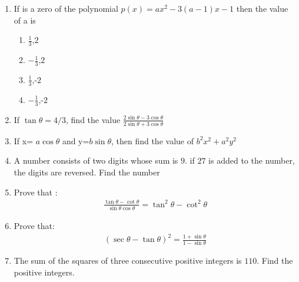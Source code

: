 \begin{enumerate}
\item If is a zero of the polynomial $p(x)=ax^2-3(a-1)x-1$  then the value of a is 
\begin{enumerate}
\item $\frac{1}{3}$,$2$
\item $-\frac{1}{3}$,$2$
\item $\frac{1}{3}$,-$2$
\item $-\frac{1}{3}$,-$2$
\end{enumerate}



\item If  $\tan \theta = 4/3$, find the value 
$\frac{2\sin \theta -3\cos \theta}{2\sin\theta+3\cos\theta}$

\item If x=  $a\cos\theta$ and y=$b\sin\theta$, then find the value of   $b^2x^2+a^2y^2$

\item A number consists of two digits whose sum is $9$. if $27$ is added to the number, the digits are reversed. Find the number
\item Prove that :
\begin{align}
\frac{\tan\theta-\cot\theta}{\sin\theta\cos\theta}=\tan^2\theta-\cot^2\theta 
\end{align}
\item Prove that:
\begin{align}
(\sec\theta-\tan\theta)^2 =\frac{1+\sin\theta}{1-\sin\theta}
\end{align}

\item The sum of the squares of three consecutive positive 
integers is $110$. Find the positive integers.


\end{enumerate}
